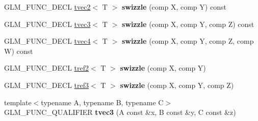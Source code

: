 \begin{DoxyCompactItemize}
\item 
\hypertarget{structglm_1_1detail_1_1tvec3_ab47b6ce6a2d23e20acec37087fb89a7e}{\-G\-L\-M\-\_\-\-F\-U\-N\-C\-\_\-\-D\-E\-C\-L \hyperlink{structglm_1_1detail_1_1tvec2}{tvec2}$<$ \-T $>$ {\bfseries swizzle} (comp \-X, comp \-Y) const }\label{structglm_1_1detail_1_1tvec3_ab47b6ce6a2d23e20acec37087fb89a7e}

\item 
\hypertarget{structglm_1_1detail_1_1tvec3_ad28f0de773115e3ffb607831537008f9}{\-G\-L\-M\-\_\-\-F\-U\-N\-C\-\_\-\-D\-E\-C\-L \hyperlink{structglm_1_1detail_1_1tvec3}{tvec3}$<$ \-T $>$ {\bfseries swizzle} (comp \-X, comp \-Y, comp \-Z) const }\label{structglm_1_1detail_1_1tvec3_ad28f0de773115e3ffb607831537008f9}

\item 
\hypertarget{structglm_1_1detail_1_1tvec3_ada514298c2f2fa218408e94527c6f134}{\-G\-L\-M\-\_\-\-F\-U\-N\-C\-\_\-\-D\-E\-C\-L \hyperlink{structglm_1_1detail_1_1tvec4}{tvec4}$<$ \-T $>$ {\bfseries swizzle} (comp \-X, comp \-Y, comp \-Z, comp \-W) const }\label{structglm_1_1detail_1_1tvec3_ada514298c2f2fa218408e94527c6f134}

\item 
\hypertarget{structglm_1_1detail_1_1tvec3_a2ee36b78d289564828faac8a4f28f683}{\-G\-L\-M\-\_\-\-F\-U\-N\-C\-\_\-\-D\-E\-C\-L \hyperlink{structglm_1_1detail_1_1tref2}{tref2}$<$ \-T $>$ {\bfseries swizzle} (comp \-X, comp \-Y)}\label{structglm_1_1detail_1_1tvec3_a2ee36b78d289564828faac8a4f28f683}

\item 
\hypertarget{structglm_1_1detail_1_1tvec3_a01f55f26122596b064d2a4ce256d5300}{\-G\-L\-M\-\_\-\-F\-U\-N\-C\-\_\-\-D\-E\-C\-L \hyperlink{structglm_1_1detail_1_1tref3}{tref3}$<$ \-T $>$ {\bfseries swizzle} (comp \-X, comp \-Y, comp \-Z)}\label{structglm_1_1detail_1_1tvec3_a01f55f26122596b064d2a4ce256d5300}

\item 
\hypertarget{structglm_1_1detail_1_1tvec3_a58cebfa4b0aa77d2923392ec2ffa5914}{{\footnotesize template$<$typename \-A, typename \-B, typename \-C$>$ }\\\-G\-L\-M\-\_\-\-F\-U\-N\-C\-\_\-\-Q\-U\-A\-L\-I\-F\-I\-E\-R {\bfseries tvec3} (\-A const \&x, \-B const \&y, \-C const \&z)}\label{structglm_1_1detail_1_1tvec3_a58cebfa4b0aa77d2923392ec2ffa5914}

\end{DoxyCompactItemize}
